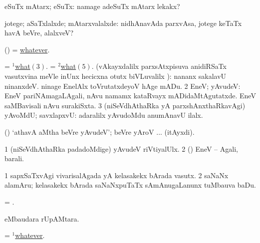 \bentry
{} 
\gl{\kirxvi}
\expl{}
\bmng
eSuTx mAtarx; eSuTx:  namage adeSuTx mAtarx lekakx? 
\emng

\noindent 
\gl{\pagu}
\expl{}
\bmng
{} jotege; aSaTxlalxde; mAtarxvalalxde:  nidhAnavAda parxvAsa, jotege keTaTx havA beVre, alalxveV? 
\emng
\eentry

\bentry
{} 
\expl{}
\bmng
(\kAparx) = \hyperlink{whatever(1)}{whatever}. 
\emng
\eentry

\bentry
{} 
\expl{}
\bmng
\bnum
{} 
\banum
{} = \hyperlink{what(1)3}{$^1$what\((3)\)}. 
 = \hyperlink{what(2)5}{$^2$what\((5)\)}. (vAkayxdalilx parxsAtxpisuva anidiRSaTx vasutxvina meVle inUnx hecicxna otutx biVLuvalilx \parx):  nananx sakalavU ninanxdeV.  ninage EnelAlx toVrutatxdeyoV hAge mADu. 
\eanum
\numie
\num{2} EneV; yAvudeV:  EneV pariNAmagaLAgali, nAvu namamx kataRvayx mADidaMtAgutatxde.  EneV saMBavisali nAvu surakiSxta. 
\num{3} (niSeVdhAthaRka yA parxshAnxthaRkavAgi) yAvoMdU; savxlapxvU:  adaralilx yAvudoMdu anumAnavU ilalx. 
\enum
\emng

\noindent 
\gl{\pagu}
\expl{}
\bmng
{} (\AmA) `athavA aMtha beVre yAvudeV'; beVre yAroV ... (itAyxdi). 
\emng
\eentry

\bentry
{}
\gl{\kirxvi}
\expl{}
\bmng
\bnum
\num{1} (niSeVdhAthaRka padadoMdige) yAvudeV riVtiyalUlx. 
\num{2} (\anw) EneV -- Agali, barali. 
\enum
\emng
\eentry

\bentry
{} 
\gl{\nA}
\expl{}
\bmng
\bnum
\num{1} sapxSaTxvAgi vivarisalAgada yA kelasakekx bArada vasutx. 
\num{2} saNaNx alamAru; kelasakekx bArada saNaNxpuTaTx sAmAnugaLanunx tuMbauva baDu. 
\enum
\emng
\eentry

\bentry
{} 
\expl{(\pArxparx)}
\bmng
= . 
\emng
\eentry

\bentry
{} 
\expl{(\kAparx)}
\bmng
  eMbaudara rUpAMtara. 
\emng
\eentry

\bentry
{} 
\expl{}
\bmng
= \hyperlink{whatever(1)}{$^1$whatever}. 
\emng
\eentry

